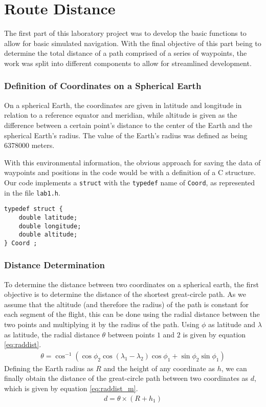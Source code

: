 \documentclass{article}
\begin{document}
\part{Route Distance}

The first part of this laboratory project was to develop the basic functions to allow for basic simulated navigation. With the final objective of this part being to determine the total distance of a path comprised of a series of waypoints, the work was split into different components to allow for streamlined development.

\section{Definition of Coordinates on a Spherical Earth}

On a spherical Earth, the coordinates are given in latitude and longitude in relation to a reference equator and meridian, while altitude is given as the difference between a certain point's distance to the center of the Earth and the spherical Earth's radius. The value of the Earth's radius was defined as being $6378000$ meters.

With this environmental information, the obvious approach for saving the data of waypoints and positions in the code would be with a definition of a C structure. Our code implements a \texttt{struct} with the \texttt{typedef} name of \texttt{Coord}, as represented in the file \texttt{lab1.h}.
\begin{verbatim}
typedef struct {
    double latitude;
    double longitude;
    double altitude;
} Coord ;
\end{verbatim}

\section{Distance Determination}

To determine the distance between two coordinates on a spherical earth, the first objective is to determine the distance of the shortest great-circle path. As we assume that the altitude (and therefore the radius) of the path is constant for each segment of the flight, this can be done using the radial distance between the two points and multiplying it by the radius of the path. Using $\phi$ as latitude and $\lambda$ as latitude, the radial distance $\theta$ between points $1$ and $2$ is given by equation \ref{eq:raddist}.
\begin{gather} \label{eq:raddist}
    \theta = \cos^{-1}{\left(\cos\phi_2\cos\left(\lambda_1 - \lambda_2\right)\cos\phi_1 + \sin\phi_2\sin\phi_1\right)}
\end{gather}
Defining the Earth radius as $R$ and the height of any coordinate as $h$, we can finally obtain the distance of the great-circle path between two coordinates as $d$, which is given by equation \ref{eq:raddist_m}.
\begin{gather} \label{eq:raddist_m}
    d = \theta \times (R + h_1)
\end{gather}
\end{document}
